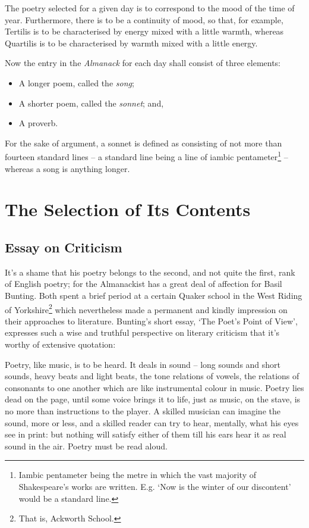 \documentclass[0main.tex]{subfiles}
\begin{document}
The poetry selected for a given day is to correspond to the mood of the time of year. Furthermore, there is to be a continuity of mood, so that, for example, Tertilis is to be characterised by energy mixed with a little warmth, whereas Quartilis is to be characterised by warmth mixed with a little energy.

Now the entry in the \emph{Almanack} for each day shall consist of three elements:

\begin{itemize}
\item[1.]{A longer poem, called the \emph{song};}
\item[2.]{A shorter poem, called the \emph{sonnet}; and,}
\item[3.]{A proverb.}
\end{itemize}

For the sake of argument, a sonnet is defined as consisting of not more than fourteen standard lines -- a standard line being a line of iambic pentameter\footnote{Iambic pentameter being the metre in which the vast majority of Shakespeare's works are written. E.g. `Now is the winter of our discontent' would be a standard line.} -- whereas a song is anything longer.

\section{The Selection of Its Contents}

\subsection{Essay on Criticism}

It's a shame that his poetry belongs to the second, and not quite the first, rank of English poetry; for the Almanackist has a great deal of affection for Basil Bunting. Both spent a brief period at a certain Quaker school in the West Riding of Yorkshire\footnote{That is, Ackworth School.} which nevertheless made a permanent and kindly impression on their approaches to literature. Bunting's short essay, `The Poet's Point of View', expresses such a wise and truthful perspective on literary criticism that it's worthy of extensive quotation:
  
\bigskip
{\footnotesize Poetry, like music, is to be heard. It deals in sound -- long sounds and short sounds, heavy beats and light beats, the tone relations of vowels, the relations of consonants to one another which are like instrumental colour in music. Poetry lies dead on the page, until some voice brings it to life, just as music, on the stave, is no more than instructions to the player. A skilled musician can imagine the sound, more or less, and a skilled reader can try to hear, mentally, what his eyes see in print: but nothing will satisfy either of them till his ears hear it as real sound in the air. Poetry must be read aloud.}
\end{document}

